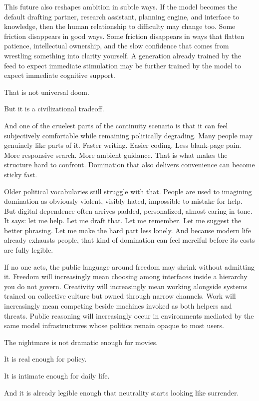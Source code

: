 \documentclass[
  american,
  12pt,
  letterpaper,
]{article}
\begin{document}
This future also reshapes ambition in subtle ways. If the model becomes
the default drafting partner, research assistant, planning engine, and
interface to knowledge, then the human relationship to difficulty may
change too. Some friction disappears in good ways. Some friction
disappears in ways that flatten patience, intellectual ownership, and
the slow confidence that comes from wrestling something into clarity
yourself. A generation already trained by the feed to expect immediate
stimulation may be further trained by the model to expect immediate
cognitive support.

That is not universal doom.

But it is a civilizational tradeoff.

And one of the cruelest parts of the continuity scenario is that it can
feel subjectively comfortable while remaining politically degrading.
Many people may genuinely like parts of it. Faster writing. Easier
coding. Less blank-page pain. More responsive search. More ambient
guidance. That is what makes the structure hard to confront. Domination
that also delivers convenience can become sticky fast.

Older political vocabularies still struggle with that. People are used
to imagining domination as obviously violent, visibly hated, impossible
to mistake for help. But digital dependence often arrives padded,
personalized, almost caring in tone. It says: let me help. Let me draft
that. Let me remember. Let me suggest the better phrasing. Let me make
the hard part less lonely. And because modern life already exhausts
people, that kind of domination can feel merciful before its costs are
fully legible.

If no one acts, the public language around freedom may shrink without
admitting it. Freedom will increasingly mean choosing among interfaces
inside a hierarchy you do not govern. Creativity will increasingly mean
working alongside systems trained on collective culture but owned
through narrow channels. Work will increasingly mean competing beside
machines invoked as both helpers and threats. Public reasoning will
increasingly occur in environments mediated by the same model
infrastructures whose politics remain opaque to most users.

The nightmare is not dramatic enough for movies.

It is real enough for policy.

It is intimate enough for daily life.

And it is already legible enough that neutrality starts looking like
surrender.
\end{document}
